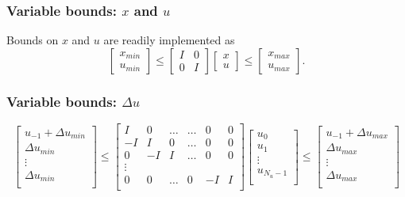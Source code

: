 \documentclass[a4paper,12pt,fleqn]{book}
\newcommand{\Nu}{{N_u}}
\begin{document}
\subsubsection{Variable bounds: $x$ and $u$}
Bounds on $x$ and $u$ are readily implemented as
\begin{equation}
\begin{bmatrix}
 x_{min}\\u_{min}
\end{bmatrix}
\leq
\begin{bmatrix}
 I &0\\
 0 & I
\end{bmatrix}
\begin{bmatrix}
 x\\u
\end{bmatrix}
\leq
\begin{bmatrix}
 x_{max}\\u_{max}
\end{bmatrix}.
\end{equation}
\subsubsection{Variable bounds: $\Delta u$}
\begin{equation}
\begin{bmatrix}
u_{-1} +\Delta u_{min}\\
\Delta u_{min}\\
\vdots\\
\Delta u_{min}\\
\end{bmatrix} \leq 
\begin{bmatrix}
  I  &  0 & \dots & \dots  & 0 & 0\\
 -I  &  I &  0    & \dots  & 0 & 0\\
  0  & -I &  I    & \dots  & 0 & 0\\
	\vdots\\
	0  &  0 & \dots & 0      &-I & I\\    
\end{bmatrix}
\begin{bmatrix}
u_0\\
u_1\\
\vdots\\
u_{\Nu-1}\\
\end{bmatrix}
\leq 
\begin{bmatrix}
u_{-1} +\Delta u_{max}\\
\Delta u_{max}\\
\vdots\\
\Delta u_{max}\\
\end{bmatrix}
\end{equation}
\end{document}
